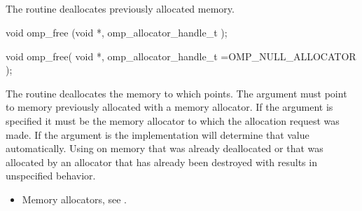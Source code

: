 \begin{ccppspecific}
\subsection{}
\label{subsec:omp_free}

\summary
The  routine deallocates previously allocated memory.

\format

\begin{cspecific}
\begin{ompcFunction}
void omp_free (void *, omp_allocator_handle_t );
\end{ompcFunction}
\end{cspecific}

\begin{cppspecific}
\begin{ompcFunction}
void omp_free(
  void *,
  omp_allocator_handle_t =OMP_NULL_ALLOCATOR
);
\end{ompcFunction}
\end{cppspecific}

\effect
The  routine deallocates the memory to which  
points. The  argument must point to memory previously allocated 
with a memory allocator. If the  argument is specified it 
must be the memory allocator to which the allocation request was made. If 
the  argument is  the implementation 
will determine that value automatically. Using  on memory 
that was already deallocated or that was allocated by an allocator that 
has already been destroyed with  results in 
unspecified behavior.

\crossreferences
\begin{itemize}
\item Memory allocators, see .
\end{itemize}

\end{ccppspecific}
